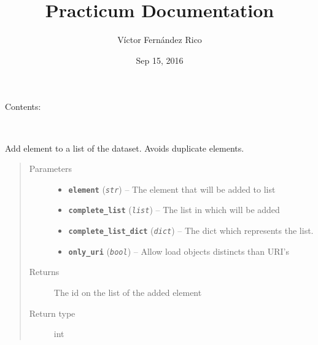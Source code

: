 \documentclass[letterpaper,10pt,english]{sphinxmanual}
\title{Practicum Documentation}
\date{Sep 15, 2016}
\author{Víctor Fernández Rico}
\begin{document}
\maketitle
\tableofcontents
{}\label{index::doc}


Contents:
\label{index:module-dataset}

\begin{fulllineitems}
\label{index:dataset.Dataset}~

\begin{fulllineitems}
\label{index:dataset.Dataset.add_element}
Add element to a list of the dataset. Avoids duplicate elements.
\begin{quote}\begin{description}
\item[{Parameters}] \leavevmode\begin{itemize}
\item {} 
\textbf{\texttt{element}} (\emph{\texttt{str}}) -- The element that will be added to list

\item {} 
\textbf{\texttt{complete\_list}} (\emph{\texttt{list}}) -- The list in which will be added

\item {} 
\textbf{\texttt{complete\_list\_dict}} (\emph{\texttt{dict}}) -- The dict which represents the list.

\item {} 
\textbf{\texttt{only\_uri}} (\emph{\texttt{bool}}) -- Allow load objects distincts than URI's

\end{itemize}

\item[{Returns}] \leavevmode
The id on the list of the added element

\item[{Return type}] \leavevmode
int

\end{description}\end{quote}

\end{fulllineitems}


\end{fulllineitems}
\end{document}
